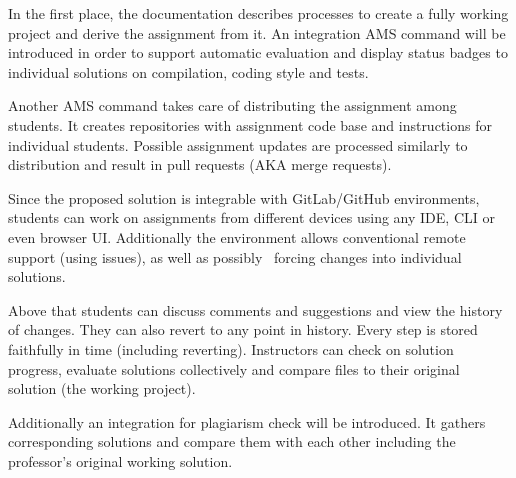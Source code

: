 {In the first place, the documentation describes processes to create a fully working project and derive the assignment from it. An integration AMS command will be introduced in order to support automatic evaluation and display status badges to individual solutions on compilation, coding style and tests.}

{Another AMS command takes care of distributing the assignment among students. It creates repositories with assignment code base and instructions for individual students. Possible assignment updates are processed similarly to distribution and result in pull requests (AKA merge requests).}

{Since the proposed solution is integrable with GitLab/GitHub environments, students can work on assignments from different devices using any IDE, CLI or even browser UI. Additionally the environment allows conventional remote support (using issues), as well as possibly ~forcing changes into individual solutions.}

{Above that students can discuss comments and suggestions and view the history of changes. They can also revert to any point in history. Every step is stored faithfully in time (including reverting). Instructors can check on solution progress, evaluate solutions collectively and compare files to their original solution (the working project).}

{Additionally an integration for plagiarism check will be introduced. It gathers corresponding solutions and compare them with each other including the professor's original working solution.}
